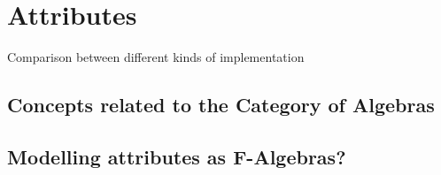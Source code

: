 \chapter{Attributes}

Comparison between different kinds of implementation

\section{Concepts related to the Category of Algebras}

\section{Modelling attributes as F-Algebras?}
